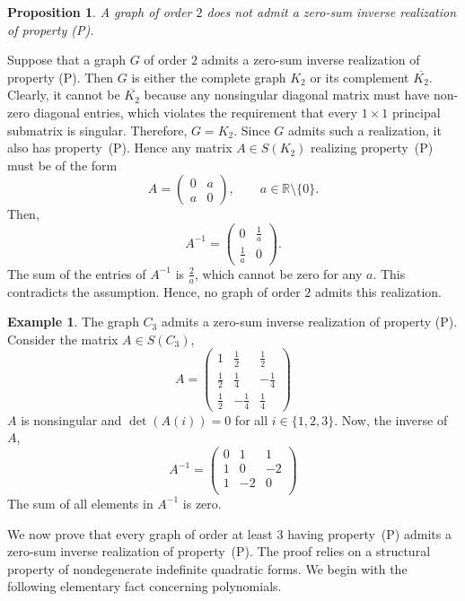 \documentclass[12pt,reqno]{amsart}
\newtheorem{lem}[thm]{Lemma}
\newtheorem{prop}[thm]{Proposition}
\theoremstyle{definition}
\newtheorem{example}[thm]{Example}
\numberwithin{equation}{subsection}
\newenvironment{pf}{\proof}{\endproof}
\numberwithin{equation}{section}
\def\det{\operatorname{det}}
\begin{document}
\begin{prop}\label{K_2}
A graph of order $2$ does not admit a zero-sum inverse realization of property (P).
\end{prop}
\begin{pf}
Suppose that a graph $G$ of order $2$ admits a zero-sum inverse realization of property (P). Then $G$ is either the complete graph $K_2$ or its complement $\overline{K_2}$. Clearly, it cannot be $\overline{K_2}$ because any nonsingular diagonal matrix must have non-zero diagonal entries, which violates the requirement that every $1 \times 1$ principal submatrix is singular. Therefore, $G=K_2$. Since $G$ admits such a realization, it also has property~(P). Hence any matrix $A\in S(K_2)$ realizing property~(P) must be of the form
\[
A=
\begin{pmatrix}
0 & a\\
a & 0
\end{pmatrix},
\qquad a \in \mathbb{R}\setminus \{0\}.
\]
Then, 
\[
A^{-1}= \begin{pmatrix}
    0 & \frac{1}{a}\\[2mm]
    \frac{1}{a} & 0
\end{pmatrix}.
\]
The sum of the entries of $A^{-1}$ is $\frac{2}{a}$, which cannot be zero for any $a$. This contradicts the assumption. Hence, no graph of order $2$ admits this realization.
\end{pf}
\begin{example}
    The graph $C_3$ admits a zero-sum inverse realization of property (P).  Consider the matrix $A\in S(C_3)$,
   \[
\renewcommand{\arraystretch}{1.4}
A=
\begin{pmatrix}
1 & \frac{1}{2} & \frac{1}{2}\\
\frac{1}{2} & \frac{1}{4} & -\frac{1}{4}\\
\frac{1}{2} & -\frac{1}{4} & \frac{1}{4}
\end{pmatrix}
\]
$A$ is nonsingular and $\det(A(i))=0$ for all $i \in \{1,2,3\}$. Now, the inverse of $A$,
\[
A^{-1}= \begin{pmatrix}
    0 & 1 & 1\\
    1 & 0 & -2\\
    1 & -2 & 0\\
\end{pmatrix}
\]
The sum of all elements in $A^{-1}$ is zero.
\end{example}

We now prove that every graph of order at least \(3\) having property~(P) admits a zero-sum inverse realization of property~(P). The proof relies on a structural property of nondegenerate indefinite quadratic forms. We begin with the following elementary fact concerning polynomials.
\end{document}

